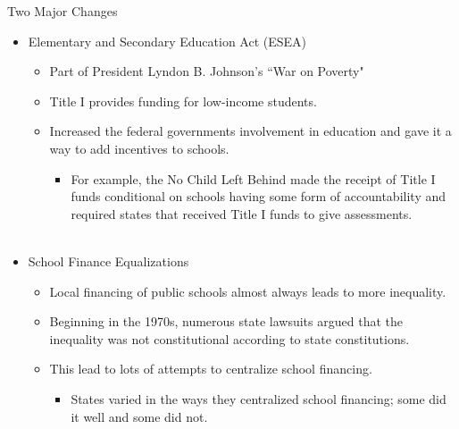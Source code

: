 \documentclass{beamer}
\begin{document}
\begin{frame}{Two Major Changes}
\begin{itemize}
\item Elementary and Secondary Education Act (ESEA)
	\begin{itemize}
	\item Part of President Lyndon B. Johnson's ``War on Poverty"
	\item Title I provides funding for low-income students. 
	\item Increased the federal governments involvement in education and gave it a way to add incentives to schools. 
		\begin{itemize}
		\item For example, the No Child Left Behind made the receipt of Title I funds conditional on schools having some form of accountability and required states that received Title I funds to give assessments. \\~\\
		\end{itemize}
	\end{itemize}
\item School Finance Equalizations
	\begin{itemize}
	\item Local financing of public schools almost always leads to more inequality. 
	\item Beginning in the 1970s, numerous state lawsuits argued that the inequality was not constitutional according to state constitutions. 
	\item This lead to lots of attempts to centralize school financing. 
		\begin{itemize}
		\item States varied in the ways they centralized school financing; some did it well and some did not. \\~\\
		\end{itemize}
	\end{itemize}
\end{itemize}
\end{frame}
\end{document}
